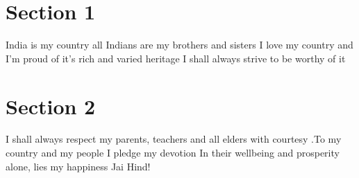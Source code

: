 \documentclass{article}
\begin{document}
	
	
	\section{Section 1}
	India is my country all Indians are my brothers and sisters I love my country and I'm proud of it's rich and varied heritage I shall always strive to be worthy of it
	
	
\section{Section 2}
I shall always respect my parents, teachers and all elders with courtesy .To my country and my people I pledge my devotion In their wellbeing and prosperity alone, lies my happiness \newline \newline   Jai Hind!
\end{document}
